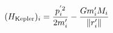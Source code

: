 \documentclass[preview]{standalone}
\begin{document}
\begin{align*}
\special{dvisvgm:raw <g id='unique000'>}(H_{\text{Kepler}})_i = \frac{p^{'2}_i}{2m'_i} - \frac{Gm'_i M_i}{\norm{r'_i}}\special{dvisvgm:raw </g>}
\end{align*}
\end{document}
